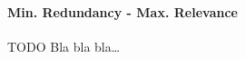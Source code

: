 \paragraph{Min. Redundancy - Max. Relevance}
\label{par:methods.flat.filter.min_redundancy_max_relevance}

  
TODO
Bla bla bla\ldots
  
